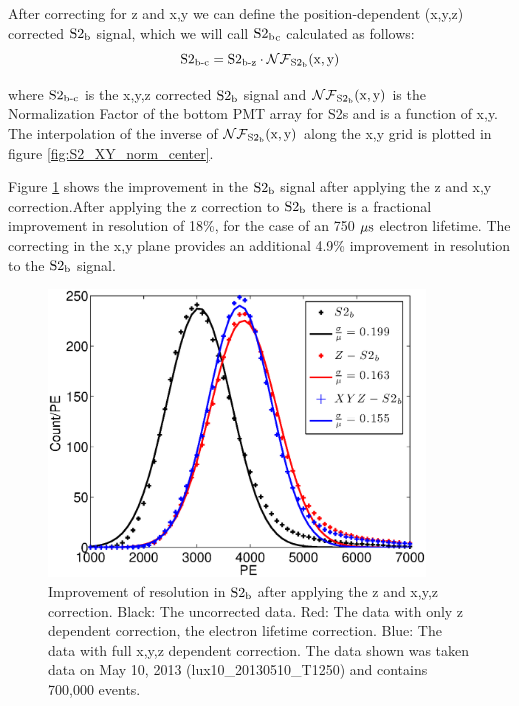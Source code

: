 After correcting for z and x,y we can define the position-dependent  (x,y,z) corrected $\rm S2_b$ signal, which we will call $\rm S2{_b}_c$ calculated as follows:
\begin{equation}
\rm S2_{\operatorname{b-c}}=S2_{\operatorname{b-z}} \cdot \mathcal{NF}_{S2_b}(x,y) %
\label{eq:S2_XYZ}
\end{equation}

\noindent where $\rm S2_{\operatorname{b-c}}$ is the x,y,z corrected $\rm S2_b$ signal and $\rm \mathcal{NF}_{S2_b}(x,y)$ is the Normalization Factor of the bottom PMT array for S2s and is a function of x,y. The interpolation of the inverse of $\rm \mathcal{NF}_{S2_b}(x,y)$ along the x,y grid is plotted in figure \ref{fig:S2_XY_norm_center}.


Figure \ref{fig:S2_res} shows the improvement in the $\rm S2_b$ signal after applying the z and x,y correction.After applying the z correction to $\rm S2_b$ there is a fractional improvement in resolution of 18\%, for the case of an 750 $\rm \mu s$ electron lifetime. The correcting in the x,y plane provides an additional 4.9\% improvement in resolution to the $\rm S2_b$ signal. 

\renewcommand{\baselinestretch}{1}
\small\normalsize
\begin{figure}[h!]\centering
\includegraphics[width=100mm]{Chapter_XYZ_Corr/Thesis_Corr_Plots/S2_corr_res.eps}
\caption{Improvement of resolution in $\rm S2_b$ after applying the z and x,y,z correction. Black: The uncorrected data. Red: The data with only z dependent correction, the electron lifetime correction. Blue: The data with full x,y,z dependent correction. The data shown was taken data on May 10, 2013 (lux10\_20130510\_T1250) and contains 700,000 \KrCal events.}
\label{fig:S2_res}
\end{figure}
\renewcommand{\baselinestretch}{2}
\small\normalsize

